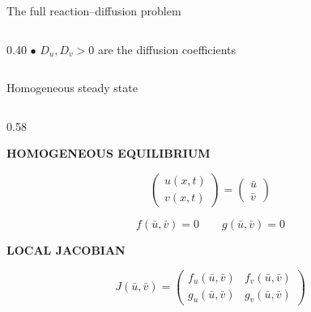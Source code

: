 \begin{frame}{The full reaction--diffusion problem}
\begin{columns}[T,onlytextwidth]
    \begin{column}{0.40\textwidth}
      {\color{HydraCyan}\fontsize{10}{10}\selectfont
        $\bullet$
      }
      {\color{HydraMuted}\fontsize{7.4}{9}\selectfont
        $D_u,D_v>0$ are the diffusion coefficients
      }
    \end{column}

  \end{columns}

\end{frame}


\begin{frame}{Homogeneous steady state}

  \vspace{-0.08cm}

  \begin{columns}[c,onlytextwidth]

    \begin{column}{0.58\textwidth}
      {\color{HydraGold}\bfseries\fontsize{7.6}{9.2}\selectfont
        HOMOGENEOUS EQUILIBRIUM\par}

      \vspace{-0.16cm}

      {\color{HydraWhite}\fontsize{11.6}{14.8}\selectfont
      \[
        \begin{pmatrix}
          u(x,t)\\
          v(x,t)
        \end{pmatrix}
        =
        \begin{pmatrix}
          \bar u\\
          \bar v
        \end{pmatrix}
      \]
      }

      \vspace{-0.22cm}

      {\color{HydraWhite}\fontsize{10.4}{13.2}\selectfont
      \[
        f(\bar u,\bar v)=0
        \qquad
        g(\bar u,\bar v)=0
      \]
      }

      \vspace{-0.18cm}

      {\color{HydraGold}\bfseries\fontsize{7.6}{9.2}\selectfont
        LOCAL JACOBIAN\par}

      \vspace{-0.16cm}

      {\color{HydraWhite}\fontsize{10.4}{13.2}\selectfont
      \[
        J(\bar u,\bar v)=
        \begin{pmatrix}
          f_u(\bar u,\bar v)&f_v(\bar u,\bar v)\\
          g_u(\bar u,\bar v)&g_v(\bar u,\bar v)
        \end{pmatrix}
      \]
      }


\end{column}
\end{columns}
\end{frame}
